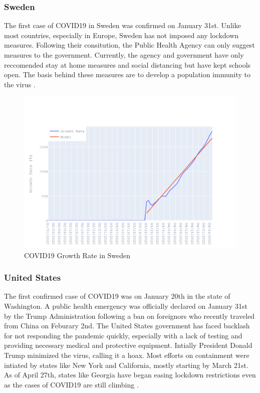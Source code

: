\documentclass{homework}
\begin{document}
\newpage
\subsubsection{Sweden}

The first case of COVID19 in Sweden was confirmed on January 31st. Unlike most countries, especially in Europe, Sweden has not imposed any lockdown measures. Following their consitution, the Public Health Agency can only suggest measures to the government. Currently, the agency and government have only reccomended stay at home measures and social distancing but have kept schools open. The basis behind these measures are to develop a population immunity to the virus \cite{savage_2020}.

\begin{figure}[H]
  \centering
  \includegraphics[scale=0.3]{task3/Sweden.png}
  \caption{COVID19 Growth Rate in Sweden}
\end{figure}


\newpage
\subsubsection{United States}

The first confirmed case of COVID19 was on January 20th in the state of Washington. A public health emergency was officially declared on January 31st by the Trump Administration following a ban on foreignors who recently traveled from China on Feburary 2nd. The United States government has faced backlash for not responding the pandemic quickly, especially with a lack of testing and providing necessary medical and protective equipment. Intially President Donald Trump minimized the virus, calling it a hoax. Most efforts on containment were intiated by states like New York and California, mostly starting by March 21st. As of April 27th, states like Georgia have began easing lockdown restrictions even as the cases of COVID19 are still climbing \cite{staff_2020}.
\end{document}
